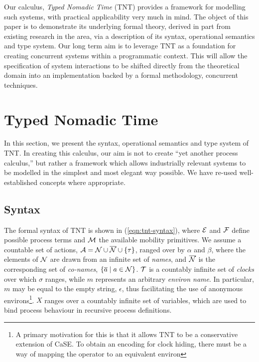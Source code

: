 \documentclass[orivec,envcountsame]{llncs}
\begin{document}
Our calculus, \emph{Typed Nomadic Time} (TNT) provides a framework for
modelling such systems, with practical
applicability very much in mind. The object of this
paper is to demonstrate its underlying formal theory, derived in part
from existing research in the area, via a description of its syntax,
operational semantics and type system. Our long term aim is to leverage
TNT as a foundation for creating concurrent systems within a
programmatic context. This will allow the specification of system interactions to be shifted directly from the
theoretical domain into an implementation backed by a formal
methodology,  concurrent
techniques.

\section{Typed Nomadic Time}
\label{tnt}

In this section, we present the syntax, operational semantics and type
system of TNT. In creating this calculus, our aim is not to create ``yet
another process calculus,'' but rather a framework which allows
industrially relevant systems to be modelled in the simplest and most
elegant way possible. We have re-used well-established concepts where
appropriate.

\subsection{Syntax}

The formal syntax of TNT is shown in (\ref{eqn:tnt-syntax}), where
$\text{$\mathcal{E}$}$ and $\text{$\mathcal{F}$}$ define possible process terms and $\text{$\mathcal{M}$}$ the
available mobility primitives. We assume a countable set of actions,
$\text{$\mathcal{A}$} = \text{$\mathcal{N}$} \cup \text{$\overline{\text{$\mathcal{N}$}}$} \cup \{\tau\}$, ranged over by $\alpha$
and $\beta$, where the elements of $\text{$\mathcal{N}$}$ are drawn from an infinite
set of \emph{names}, and $\text{$\overline{\text{$\mathcal{N}$}}$}$ is the corresponding set of
\emph{co-names}, $\{\overline{a} \mid a \in \text{$\mathcal{N}$}\}$. $\text{$\mathcal{T}$}$ is a
countably infinite set of \emph{clocks} over which $\sigma$ ranges,
while $m$ represents an arbitrary \emph{environ name}. In particular,
$m$ may be equal to the empty string, $\epsilon$, thus facilitating the
use of anonymous environs\footnote{A primary motivation for this is that
it allows TNT to be a conservative extension of CaSE. To obtain an
encoding for clock hiding, there must be a way of mapping the operator
to an equivalent environ}. $X$ ranges over a countably infinite set of
variables, which are used to bind process behaviour in recursive process
definitions.
\end{document}
